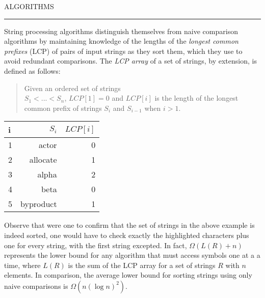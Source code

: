 
\sffamily\normalsize{\color{sciorange}ALGORITHMS}\small\\
\rule[3mm]{190mm}{0.1pt}\vspace{-8mm}
\begin{multicols}{3}
\footnotesize
String processing algorithms distinguish themselves from naive comparison
algorithms by maintaining knowledge of the lengths of the {\em longest common
prefixes} (LCP) of pairs of input strings as they sort them, which they use to
avoid redundant comparisons.  The {\em LCP array} of a set of strings, by
extension, is defined as follows:

\begin{quote}
    Given an ordered set of strings\\ $S_1 < ... < S_n$,
    $LCP[1] = 0$ and $LCP[i]$ is the length of the longest common prefix of
    strings $S_i$ and $S_{i-1}$ when $i > 1$.
\end{quote}

\begin{center}
\begin{tabular}{lrr}
    i&  $S_i$&          $LCP[i]$\\ \hline
    1&  actor&        0\\
    2&  {\color{red}a}llocate&   1\\
    3&  {\color{red}al}pha&      2\\
    4&  beta&         0\\
    5&  {\color{red}b}yproduct&  1\\
\end{tabular}
\end{center}

Observe that were one to confirm that the set of strings in the above example
is indeed sorted, one would have to check exactly the highlighted characters
plus one for every string, with the first string excepted.
In fact, $\Omega(L(R) + n)$ represents the lower bound for any algorithm that must
access symbols one at a a time, where $L(R)$ is the sum of the LCP array for
a set of strings $R$ with $n$ elements.  In comparison, the
average lower bound for sorting strings using only naive comparisons is
$\Omega(n(\log n)^2)$.
\end{multicols}%


